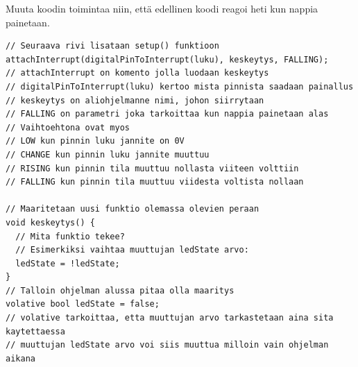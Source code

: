 \begin{tcolorbox}[title=Haaste!,colback=teal!10,colbacktitle=teal!90]
Muuta koodin toimintaa niin, että edellinen koodi reagoi heti kun nappia painetaan.
\end{tcolorbox}

\begin{tcolorbox}[colback=white,title=Vinkkejä Arduinolla koodaamiseen!,colbacktitle=purple!90]
\begin{lstlisting}
// Seuraava rivi lisataan setup() funktioon
attachInterrupt(digitalPinToInterrupt(luku), keskeytys, FALLING);
// attachInterrupt on komento jolla luodaan keskeytys
// digitalPinToInterrupt(luku) kertoo mista pinnista saadaan painallus
// keskeytys on aliohjelmanne nimi, johon siirrytaan
// FALLING on parametri joka tarkoittaa kun nappia painetaan alas
// Vaihtoehtona ovat myos
// LOW kun pinnin luku jannite on 0V
// CHANGE kun pinnin luku jannite muuttuu
// RISING kun pinnin tila muuttuu nollasta viiteen volttiin
// FALLING kun pinnin tila muuttuu viidesta voltista nollaan

// Maaritetaan uusi funktio olemassa olevien peraan
void keskeytys() {
  // Mita funktio tekee?
  // Esimerkiksi vaihtaa muuttujan ledState arvo:
  ledState = !ledState;
}
// Talloin ohjelman alussa pitaa olla maaritys
volative bool ledState = false;
// volative tarkoittaa, etta muuttujan arvo tarkastetaan aina sita kaytettaessa
// muuttujan ledState arvo voi siis muuttua milloin vain ohjelman aikana
\end{lstlisting}
\end{tcolorbox}

